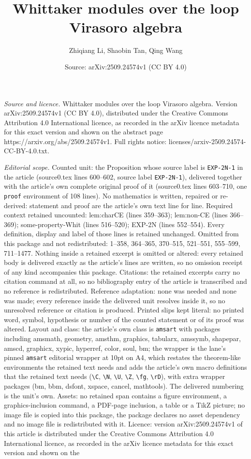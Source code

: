 \documentclass[10pt,a4paper]{amsart}
\title[Whittaker modules over the loop Virasoro algebra]{Whittaker modules over the loop Virasoro algebra}
\author{Zhiqiang Li, Shaobin Tan, Qing Wang}
\date{Source: arXiv:2509.24574v1 (CC BY 4.0)}
\begin{document}
\maketitle

\noindent\emph{Source and licence.} Whittaker modules over the loop Virasoro algebra. Version arXiv:2509.24574v1 (CC BY 4.0), distributed under the Creative Commons Attribution 4.0 International licence, as recorded in the arXiv licence metadata for this exact version and shown on the abstract page https://arxiv.org/abs/2509.24574v1. Full rights notice: licenses/arxiv-2509.24574-CC-BY-4.0.txt.\par\smallskip

\noindent\textit{Editorial scope.} Counted unit: the Proposition whose source label is \texttt{EXP-2N-1} in the article (source0.tex lines 600--602, source label \texttt{EXP-2N-1}), delivered together with the article's own complete original proof of it (source0.tex lines 603--710, one \texttt{proof} environment of 108 lines). No mathematics is written, repaired or re-derived: statement and proof are the article's own text line for line. Required context retained uncounted: lem:charCE (lines 359--363); lem:non-CE (lines 366--369); some-property-Whit (lines 516--520); EXP-2N (lines 552--554). Every definition, display and label of those lines is retained unchanged. Omitted from this package and not redistributed: 1--358, 364--365, 370--515, 521--551, 555--599, 711--1477. Nothing inside a retained excerpt is omitted or altered: every retained body is delivered exactly as the article's lines are written, so no omission receipt of any kind accompanies this package. Citations: the retained excerpts carry no citation command at all, so no bibliography entry of the article is transcribed and no reference is redistributed. Reference adaptation: none was needed and none was made; every reference inside the delivered unit resolves inside it, so no unresolved reference or citation is produced. Printed slips kept literal: no printed word, symbol, hypothesis or number of the counted statement or of its proof was altered. Layout and class: the article's own class is \texttt{amsart} with packages including amsmath, geometry, amsthm, graphics, tabularx, amssymb, shapepar, amscd, graphicx, xypic, hyperref, color, soul, bm; the wrapper is the lane's pinned \texttt{amsart} editorial wrapper at 10pt on A4, which restates the theorem-like environments the retained text needs and adds the article's own macro definitions that the retained text needs (\texttt{\textbackslash C}, \texttt{\textbackslash N}, \texttt{\textbackslash U}, \texttt{\textbackslash Z}, \texttt{\textbackslash fg}, \texttt{\textbackslash rD}), with extra wrapper packages (bm, bbm, dsfont, xspace, cancel, mathtools). The delivered numbering is the unit's own. Assets: no retained span contains a figure environment, a graphics-inclusion command, a PDF-page inclusion, a table or a TikZ picture; no image file is copied into this package, the package declares no asset dependency and no image file is redistributed with it. Licence: version arXiv:2509.24574v1 of this article is distributed under the Creative Commons Attribution 4.0 International licence, as recorded in the arXiv licence metadata for this exact version and shown on the 
\end{document}
